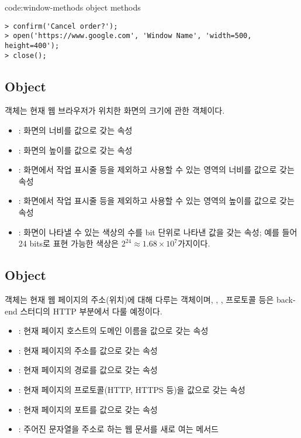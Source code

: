 \begin{codeenv}{code:window-methods}{ object methods}\begin{verbatim}
> confirm('Cancel order?');
> open('https://www.google.com', 'Window Name', 'width=500, height=400');
> close();
\end{verbatim}
\end{codeenv}
\clearpage

\subsection*{ Object}

 객체는 현재 웹 브라우저가 위치한 화면의 크기에 관한 객체이다.

\begin{itemize}
    \item {}: 화면의 너비를 값으로 갖는 속성
    \item {}: 화면의 높이를 값으로 갖는 속성
    \item {}: 화면에서 작업 표시줄 등을 제외하고 사용할 수 있는 영역의 너비를 값으로 갖는 속성
    \item {}: 화면에서 작업 표시줄 등을 제외하고 사용할 수 있는 영역의 높이를 값으로 갖는 속성
    \item {}: 화면이 나타낼 수 있는 색상의 수를 bit 단위로 나타낸 값을 갖는 속성; 예를 들어 24 bits로 표현 가능한 색상은 $2^{24} \approx 1.68 \times 10^7$가지이다.
\end{itemize}

\subsection*{ Object}

 객체는 현재 웹 페이지의 주소(위치)에 대해 다루는 객체이며, , , 프로토콜 등은 back-end 스터디의 HTTP 부분에서 다룰 예정이다.

\begin{itemize}
    \item {}: 현재 페이지 호스트의 도메인 이름을 값으로 갖는 속성
    \item {}: 현재 페이지의 주소를 값으로 갖는 속성
    \item {}: 현재 페이지의 경로를 값으로 갖는 속성
    \item {}: 현재 페이지의 프로토콜(HTTP, HTTPS 등)을 값으로 갖는 속성
    \item {}: 현재 페이지의 포트를 값으로 갖는 속성
    \item {}: 주어진 문자열을 주소로 하는 웹 문서를 새로 여는 메서드
\end{itemize}

